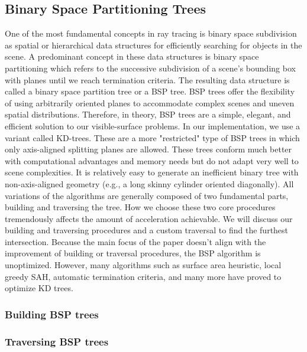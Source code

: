 \documentclass[a4paper,11pt,oneside]{article}
\begin{document}
\subsection{Binary Space Partitioning Trees}

One of the most fundamental concepts in ray tracing is binary space subdivision as spatial or hierarchical data structures for efficiently searching for objects in the scene. A predominant concept in these data structures is binary space partitioning which refers to the successive subdivision of a scene's bounding box with planes until we reach termination criteria. The resulting data structure is called a binary space partition tree or a BSP tree. BSP trees offer the flexibility of using arbitrarily oriented planes to accommodate complex scenes and uneven spatial distributions. Therefore, in theory, BSP trees are a simple, elegant, and efficient solution to our visible-surface problems. In our implementation, we use a variant called KD-trees. These are a more "restricted" type of BSP trees in which only axis-aligned splitting planes are allowed. These trees conform much better with computational advantages and memory needs but do not adapt very well to scene complexities. It is relatively easy to generate an inefficient binary tree with non-axis-aligned geometry (e.g., a long skinny cylinder oriented diagonally). All variations of the algorithms are generally composed of two fundamental parts, building and traversing the tree. How we choose these two core procedures tremendously affects the amount of acceleration achievable. We will discuss our building and traversing procedures and a custom traversal to find the furthest intersection. Because the main focus of the paper doesn't align with the improvement of building or traversal procedures, the BSP algorithm is unoptimized. However, many algorithms such as surface area heuristic, local greedy SAH, automatic termination criteria, and many more have proved to optimize KD trees.

\subsubsection{Building BSP trees}

\subsubsection{Traversing BSP trees}
\end{document}
